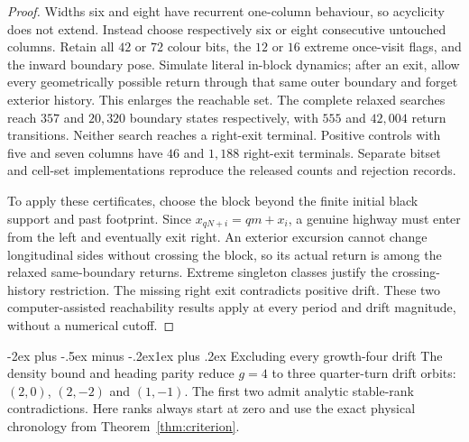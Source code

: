 \documentclass[11pt,letterpaper]{article}
\makeatletter
\renewcommand\section{\@startsection{section}{1}{\z@}%
  {-2ex plus -.5ex minus -.2ex}{1ex plus .2ex}%
  {\normalfont\Large\bfseries}}
\makeatother
\begin{document}
\begin{proof}
Widths six and eight have recurrent one-column behaviour, so acyclicity
does not extend. Instead choose respectively six or eight consecutive
untouched columns. Retain all $42$ or $72$ colour bits, the $12$ or
$16$ extreme once-visit flags, and the inward boundary pose. Simulate
literal in-block dynamics; after an exit, allow every geometrically
possible return through that same outer boundary and forget exterior
history. This enlarges the reachable set. The complete relaxed searches reach $357$ and $20{,}320$ boundary states
respectively, with $555$ and $42{,}004$ return transitions. Neither
search reaches a right-exit terminal. Positive controls with
five and seven columns have $46$ and $1{,}188$ right-exit terminals.
Separate bitset and cell-set implementations reproduce the released
counts and rejection records.

To apply these certificates, choose the block beyond the finite initial
black support and past footprint. Since $x_{qN+i}=qm+x_i$, a genuine
highway must enter from the left and eventually exit right. An exterior
excursion cannot change longitudinal sides without crossing the block,
so its actual return is among the relaxed same-boundary returns. Extreme singleton classes justify the crossing-history restriction.
The missing right exit contradicts positive drift. These two
computer-assisted reachability results apply at every period and drift
magnitude, without a numerical cutoff.
\end{proof}

\section{Excluding every growth-four drift}\label{sec:growthfour}
The density bound and heading parity reduce $g=4$ to three quarter-turn
drift orbits: $(2,0)$, $(2,-2)$ and $(1,-1)$. The first two admit
analytic stable-rank contradictions. Here ranks always start at zero
and use the exact physical chronology from Theorem~\ref{thm:criterion}.
\end{document}
